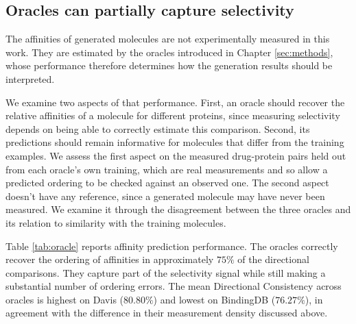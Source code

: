\documentclass[a4paper,12pt]{article}
\begin{document}
\subsection{Oracles can partially capture selectivity}\label{sec:oracles}
The affinities of generated molecules are not experimentally measured in this work. They are estimated by the oracles introduced in Chapter \ref{sec:methods}, whose performance therefore determines how the generation results should be interpreted.

We examine two aspects of that performance. First, an oracle should recover the relative affinities of a molecule for different proteins, since measuring selectivity depends on being able to correctly estimate this comparison. Second, its predictions should remain informative for molecules that differ from the training examples. We assess the first aspect on the measured drug-protein pairs held out from each oracle's own training, which are real measurements and so allow a predicted ordering to be checked against an observed one. The second aspect doesn't have any reference, since a generated molecule may have never been measured. We examine it through the disagreement between the three oracles and its relation to similarity with the training molecules.

Table \ref{tab:oracle} reports affinity prediction performance. The oracles correctly recover the ordering of affinities in approximately $75\%$ of the directional comparisons. They capture part of the selectivity signal while still making a substantial number of ordering errors. The mean Directional Consistency across oracles is highest on Davis ($80.80\%$) and lowest on BindingDB ($76.27\%$), in agreement with the difference in their measurement density discussed above.
\end{document}
